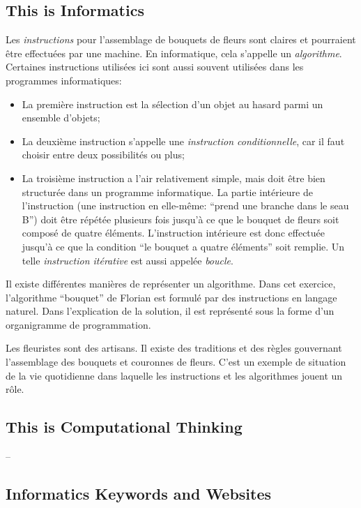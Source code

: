 \documentclass[a4paper,11pt]{report}
\begin{document}
\subsection*{This is Informatics}

Les \emph{instructions} pour l’assemblage de bouquets de fleurs sont claires et pourraient être effectuées par une machine. En informatique, cela s’appelle un \emph{algorithme}. Certaines instructions utilisées ici sont aussi souvent utilisées dans les programmes informatiques:

\begin{itemize}
  \item La première instruction est la sélection d’un objet au hasard parmi un ensemble d’objets;
  \item La deuxième instruction s’appelle une \emph{instruction conditionnelle}, car il faut choisir entre deux possibilités ou plus;
  \item La troisième instruction a l’air relativement simple, mais doit être bien structurée dans un programme informatique. La partie intérieure de l’instruction (une instruction en elle-même: “prend une branche dans le seau B”) doit être répétée plusieurs fois jusqu’à ce que le bouquet de fleurs soit composé de quatre éléments. L’instruction intérieure est donc effectuée jusqu’à ce que la condition “le bouquet a quatre éléments” soit remplie. Un telle \emph{instruction itérative} est aussi appelée \emph{boucle}.
\end{itemize}

Il existe différentes manières de représenter un algorithme. Dans cet exercice, l’algorithme “bouquet” de Florian est formulé par des instructions en langage naturel. Dans l’explication de la solution, il est représenté sous la forme d’un organigramme de programmation.

Les fleuristes sont des artisans. Il existe des traditions et des règles gouvernant l’assemblage des bouquets et couronnes de fleurs. C’est un exemple de situation de la vie quotidienne dans laquelle les instructions et les algorithmes jouent un rôle.


\subsection*{This is Computational Thinking}

–


\subsection*{Informatics Keywords and Websites}
\end{document}
